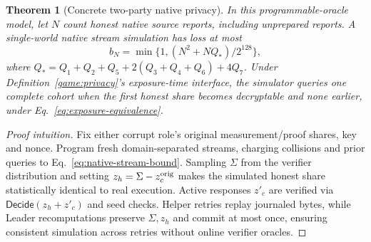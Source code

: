 \documentclass[conference,compsoc]{IEEEtran}
\theoremstyle{definition}
\numberwithin{equation}{section}
\numberwithin{table}{section}
\numberwithin{figure}{section}
\theoremstyle{plain}
\newtheorem{theorem}{Theorem}[section]
\newtheorem{theorem}{Theorem}
\begin{document}
\begin{theorem}[Concrete two-party native privacy]
\label{thm:concrete-two-party-native}
In this programmable-oracle model, let \(N\) count honest native source
reports, including unprepared reports.
A single-world native stream simulation has loss at most
\begin{equation}
 b_N=\min\{1,(N^2+NQ_*)/2^{128}\},
 \label{eq:native-stream-bound}
\end{equation}
where \(Q_*=Q_1+Q_2+Q_5+2(Q_3+Q_4+Q_6)+4Q_7\).
Under Definition~\ref{game:privacy}'s exposure-time interface, the simulator
queries one complete cohort when the first honest share becomes
decryptable and none earlier, under Eq.~\eqref{eq:exposure-equivalence}.
\end{theorem}
\begin{proof}[Proof intuition]
Fix either corrupt role's original measurement/proof shares, key and nonce.
Program fresh domain-separated streams, charging collisions and prior queries
to Eq.~\eqref{eq:native-stream-bound}. Sampling \(\Sigma\) from the verifier distribution
and setting \(z_h=\Sigma-z_c^{\rm orig}\) makes the simulated honest share statistically identical
to real execution. Active responses \(z'_c\) are verified via \(\mathsf{Decide}(z_h+z'_c)\)
and seed checks. Helper retries replay journaled bytes, while Leader
recomputations preserve \(\Sigma,z_h\) and commit at most once, ensuring
consistent simulation across retries without online verifier oracles.
\end{proof}
\end{document}
